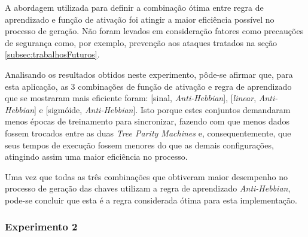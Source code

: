 \documentclass[12pt]{article}
\begin{document}
                
                
                
                
            
                
                
                

                A abordagem utilizada para definir a combinação ótima entre regra de aprendizado e função de ativação foi atingir a maior eficiência possível no processo de geração. Não foram levados em consideração fatores como precauções de segurança como, por exemplo, prevenção aos ataques tratados na seção \ref{subsec:trabalhosFuturos}.
                
                Analisando os resultados obtidos neste experimento, pôde-se afirmar que, para esta aplicação, as 3 combinações de função de ativação e regra de aprendizado que se mostraram mais eficiente foram: [sinal, \textit{Anti-Hebbian}], [\textit{linear}, \textit{Anti-Hebbian}] e [sigmóide, \textit{Anti-Hebbian}]. Isto porque estes conjuntos demandaram menos épocas de treinamento para sincronizar, fazendo com que menos dados fossem trocados entre as duas \textit{Tree Parity Machines} e, consequentemente, que seus tempos de execução fossem menores do que as demais configurações, atingindo assim uma maior eficiência no processo.
                
                Uma vez que todas as três combinações que obtiveram maior desempenho no processo de geração das chaves utilizam a regra de aprendizado \textit{Anti-Hebbian}, pode-se concluir que esta é a regra considerada ótima para esta implementação.
            
            \subsubsection{Experimento 2}
            \label{subsubsec:experimentoGamma}
            
\end{document}
